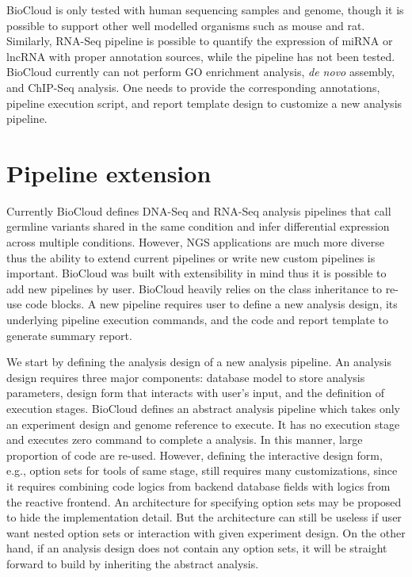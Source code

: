
BioCloud is only tested with human sequencing samples and genome, though it is
possible to support other well modelled organisms such as mouse and rat.
Similarly, RNA-Seq pipeline is possible to quantify the expression of miRNA or
lncRNA with proper annotation sources, while the pipeline has not been tested.
BioCloud currently can not perform GO enrichment analysis, \textit{de novo}
assembly, and ChIP-Seq analysis. One needs to provide the corresponding
annotations, pipeline execution script, and report template design to customize
a new analysis pipeline.



\section{Pipeline extension}
\label{s:pipeline-extension}

Currently BioCloud defines DNA-Seq and RNA-Seq analysis pipelines that call
germline variants shared in the same condition and infer differential
expression across multiple conditions. However, NGS applications are much more
diverse thus the ability to extend current pipelines or write new custom
pipelines is important. BioCloud was built with extensibility in mind thus it
is possible to add new pipelines by user. BioCloud heavily relies on the class
inheritance to re-use code blocks. A new pipeline requires user to define a new
analysis design, its underlying pipeline execution commands, and the code and
report template to generate summary report.

We start by defining the analysis design of a new analysis pipeline. An
analysis design requires three major components: database model to store
analysis parameters, design form that interacts with user's input, and the
definition of execution stages. BioCloud defines an abstract analysis pipeline
which takes only an experiment design and genome reference to execute. It has
no execution stage and executes zero command to complete a analysis. In this
manner, large proportion of code are re-used. However, defining the interactive
design form, e.g., option sets for tools of same stage, still requires many
customizations, since it requires combining code logics from backend database
fields with logics from the reactive frontend. An architecture for specifying
option sets may be proposed to hide the implementation detail. But the
architecture can still be useless if user want nested option sets or
interaction with given experiment design. On the other hand, if an analysis
design does not contain any option sets, it will be straight forward to build
by inheriting the abstract analysis.

